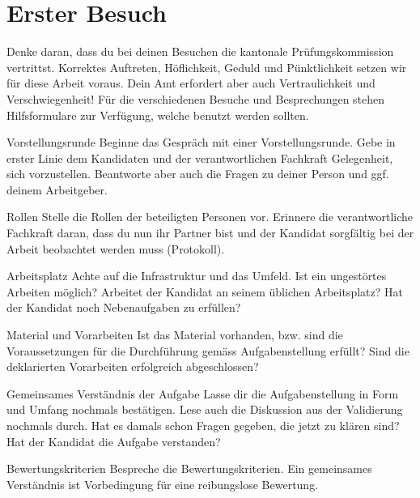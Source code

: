 \chapter{Erster Besuch}
Denke daran, dass du bei deinen Besuchen die kantonale Prüfungskommission vertrittst. Korrektes Auftreten, Höflichkeit, Geduld und Pünktlichkeit setzen wir für diese Arbeit voraus. Dein Amt erfordert aber auch Vertraulichkeit und Verschwiegenheit! Für die verschiedenen Besuche und Besprechungen stehen Hilfsformulare zur Verfügung, welche benutzt werden sollten.

\begin{taskitem}{Vorstellungsrunde}
  Beginne das Gespräch mit einer Vorstellungsrunde. Gebe in erster Linie dem Kandidaten und der verantwortlichen Fachkraft Gelegenheit, sich vorzustellen. Beantworte aber auch die Fragen zu deiner Person und ggf. deinem Arbeitgeber.
\end{taskitem}
\begin{taskitem}{Rollen}
  Stelle die Rollen der beteiligten Personen vor. Erinnere die verantwortliche Fachkraft daran, dass du nun ihr Partner bist und der Kandidat sorgfältig bei der Arbeit beobachtet werden muss (Protokoll).
\end{taskitem}
\begin{taskitem}{Arbeitsplatz}
  Achte auf die Infrastruktur und das Umfeld. Ist ein ungestörtes Arbeiten möglich? Arbeitet der Kandidat an seinem üblichen Arbeitsplatz? Hat der Kandidat noch Nebenaufgaben zu erfüllen?
\end{taskitem}
\begin{taskitem}{Material und Vorarbeiten}
  Ist das Material vorhanden, bzw. sind die Voraussetzungen für die Durchführung gemäss Aufgabenstellung erfüllt? Sind die deklarierten Vorarbeiten erfolgreich abgeschlossen?
\end{taskitem}
\begin{taskitem}{Gemeinsames Verständnis der Aufgabe}
  Lasse dir die Aufgabenstellung in Form und Umfang nochmals bestätigen. Lese auch die Diskussion aus der Validierung nochmals durch. Hat es damals schon Fragen gegeben, die jetzt zu klären sind? Hat der Kandidat die Aufgabe verstanden?
\end{taskitem}
\begin{taskitem}{Bewertungskriterien}
  Bespreche die Bewertungskriterien. Ein gemeinsames Verständnis ist Vorbedingung für eine reibungslose Bewertung.
\end{taskitem}

